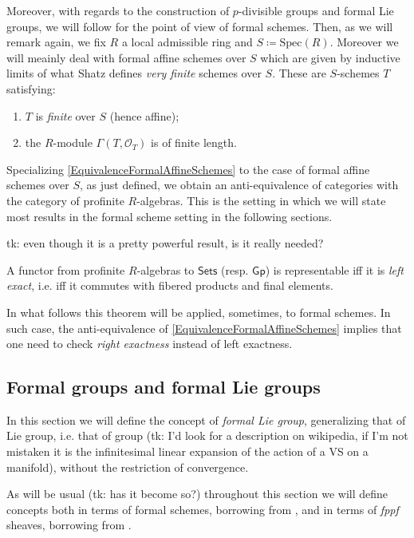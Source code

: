 \documentclass[../Main]{subfiles}
\begin{document}
\begin{rem}[]\label{VeryFiniteSchemes}
	Moreover, with regards to the construction of $p$-divisible groups
	and formal Lie groups, we will follow \cite[\S5]{Shatz} for the point
	of view of formal schemes.
	Then, as we will remark again, we fix $R$ a 
	local admissible ring and $S \coloneqq \mathrm{Spec}(R)$.
	Moreover we will meainly deal with formal affine schemes over $S$ which
	are given by inductive limits of what Shatz defines {\em very finite} schemes over $S$.
	These are $S$-schemes $T$ satisfying:
	\begin{enumerate}
		\item $T$ is {\em finite} over $S$ (hence affine);
		\item the $R$-module $\Gamma \left( T , \mathcal{O}_{ T } \right)$
			is of finite length.
	\end{enumerate}
	Specializing \cref{EquivalenceFormalAffineSchemes} to the case of
	formal affine schemes over $S$, 
	as just defined,
	we obtain an anti-equivalence of categories with the category of
	profinite $R$-algebras.
	This is the setting in which we will state most results in the 
	formal scheme setting in the following sections.
\end{rem}


tk: even though it is a pretty powerful result, is it really needed?
\begin{thm}
	A functor from profinite $R$-algebras to $\mathsf{Sets}$ (resp$.$ $\mathsf{Gp}$)
	is representable iff it is {\em left exact}, i.e.
	iff it commutes with fibered products and final elements.
\end{thm}
In what follows this theorem will be applied, sometimes,
to formal schemes. In such case, the anti-equivalence of \cref{EquivalenceFormalAffineSchemes}
implies that one need to check {\em right exactness} instead of left exactness.

\subsection{Formal groups and formal Lie groups}
In this section we will define the concept of {\em formal Lie group},
generalizing that of Lie group, i.e. that of group (tk: I'd look for a description
on wikipedia, if I'm not mistaken it is the infinitesimal linear expansion of
the action of a VS on a manifold), without the restriction of convergence.

As will be usual (tk: has it become so?) throughout this section we will define
concepts both in terms of formal schemes, borrowing from \cite{Shatz},
and in terms of {\em fppf} sheaves, borrowing from \cite{Messing}.
\end{document}
